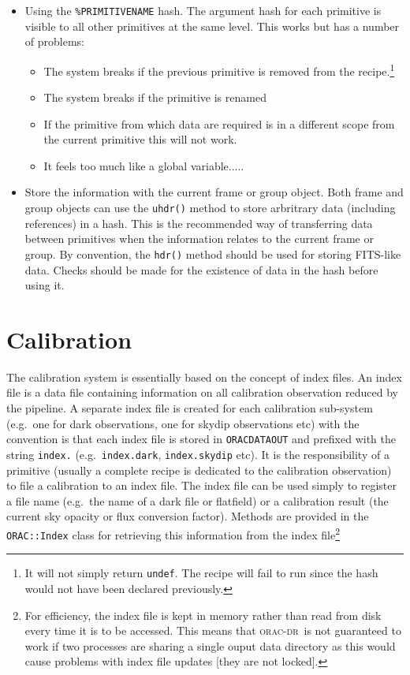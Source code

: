 \documentclass[twoside,11pt]{article}
\renewcommand{\_}{\texttt{\symbol{95}}}
\newcommand{\Oracdr}{\textsc{orac-dr}}
\begin{document}
\begin{itemize}
\item Using the \texttt{\%\_PRIMITIVE\_NAME\_} hash. The argument hash 
for each primitive is visible to all other primitives at the same
level. This works but has a number of problems:
\begin{itemize}
\item The system breaks if the previous primitive is removed from the
recipe.\footnote{It will not simply return \texttt{undef}. The recipe
will fail to run since the hash would not have been declared previously.}
\item The system breaks if the primitive is renamed
\item If the primitive from which data are required is in a different
scope from the current primitive this will not work.
\item It feels too much like a global variable.....
\end{itemize}

\item Store the information with the current frame or group object.
Both frame and group objects can use the \texttt{uhdr()} method to
store arbritrary data (including references) in a hash. This is the
recommended way of transferring data between primitives when the
information relates to the current frame or group. By convention, the
\texttt{hdr()} method should be used for storing FITS-like data.
Checks should be made for the existence of data in the hash before
using it.
\end{itemize}


\section{Calibration}

The calibration system is essentially based on the concept of index
files.  An index file is a data file containing information on all
calibration observation reduced by the pipeline. A separate index file
is created for each calibration sub-system (e.g.\ one for dark
observations, one for skydip observations etc) with the convention is
that each index file is stored in \texttt{ORAC\_DATA\_OUT} and
prefixed with the string \texttt{index.} (e.g.\ \texttt{index.dark},
\texttt{index.skydip} etc). It is the responsibility of a primitive
(usually a complete recipe is dedicated to the calibration
observation) to file a calibration to an index file. The index file
can be used simply to register a file name (e.g.\ the name of a dark file
or flatfield) or a calibration result (the current sky opacity or flux
conversion factor). Methods are provided in the \texttt{ORAC::Index}
class for retrieving this information from the index file\footnote{For
efficiency, the index file is kept in memory rather than read from
disk every time it is to be accessed. This means that \Oracdr\ is not
guaranteed to work if two processes are sharing a single ouput data
directory as this would cause problems with index file updates [they
are not locked].}
\end{document}
